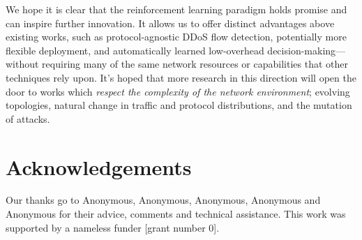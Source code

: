 \documentclass[conference, letterpaper, 10pt, times]{IEEEtran}
\begin{document}
We hope it is clear that the reinforcement learning paradigm holds promise and can inspire further innovation.
It allows us to offer distinct advantages above existing works, such as protocol-agnostic DDoS flow detection, potentially more flexible deployment, and automatically learned low-overhead decision-making---without requiring many of the same network resources or capabilities that other techniques rely upon.
It's hoped that more research in this direction will open the door to works which \emph{respect the complexity of the network environment}; evolving topologies, natural change in traffic and protocol distributions, and the mutation of attacks.

\section*{Acknowledgements}
Our thanks go to Anonymous, Anonymous, Anonymous, Anonymous and Anonymous for their advice, comments and technical assistance.
This work was supported by a nameless funder [grant number 0].

\renewcommand*{\bibfont}{\small}
\printbibliography
\end{document}
